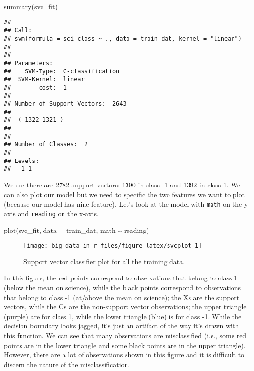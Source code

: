 \documentclass[
]{book}
\newenvironment{Shaded}{\begin{snugshade}}{\end{snugshade}}
\newcommand{\AttributeTok}[1]{\textcolor[rgb]{0.77,0.63,0.00}{#1}}
\newcommand{\FunctionTok}[1]{\textcolor[rgb]{0.00,0.00,0.00}{#1}}
\newcommand{\NormalTok}[1]{#1}
\newcommand{\SpecialCharTok}[1]{\textcolor[rgb]{0.00,0.00,0.00}{#1}}
\begin{document}
\begin{Shaded}
\begin{Highlighting}[]
\FunctionTok{summary}\NormalTok{(svc\_fit)}
\end{Highlighting}
\end{Shaded}

\begin{verbatim}
## 
## Call:
## svm(formula = sci_class ~ ., data = train_dat, kernel = "linear")
## 
## 
## Parameters:
##    SVM-Type:  C-classification 
##  SVM-Kernel:  linear 
##        cost:  1 
## 
## Number of Support Vectors:  2643
## 
##  ( 1322 1321 )
## 
## 
## Number of Classes:  2 
## 
## Levels: 
##  -1 1
\end{verbatim}

We see there are 2782 support vectors: 1390 in class -1 and 1392 in class 1. We can also plot our model but we need to specific the two features we want to plot (because our model has nine feature). Let's look at the model with \texttt{math} on the y-axis and \texttt{reading} on the x-axis.

\begin{Shaded}
\begin{Highlighting}[]
\FunctionTok{plot}\NormalTok{(svc\_fit, }\AttributeTok{data =}\NormalTok{ train\_dat, math }\SpecialCharTok{\textasciitilde{}}\NormalTok{ reading)}
\end{Highlighting}
\end{Shaded}

\begin{figure}
\texttt{[image: big-data-in-r\_files/figure-latex/svcplot-1]} \caption{Support vector classifier plot for all the training data.}\label{fig:svcplot}
\end{figure}

In this figure, the red points correspond to observations that belong to class 1 (below the mean on science), while the black points correspond to observations that belong to class -1 (at/above the mean on science); the Xs are the support vectors, while the Os are the non-support vector observations; the upper triangle (purple) are for class 1, while the lower triangle (blue) is for class -1. While the decision boundary looks jagged, it's just an artifact of the way it's drawn with this function. We can see that many observations are misclassified (i.e., some red points are in the lower triangle and some black points are in the upper triangle). However, there are a lot of observations shown in this figure and it is difficult to discern the nature of the misclassification.
\end{document}
